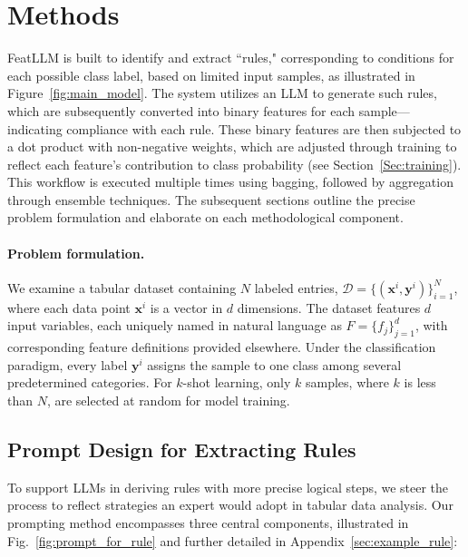 \section{Methods}
\textsf{FeatLLM} is built to identify and extract ``rules," corresponding to conditions for each possible class label, based on limited input samples, as illustrated in Figure~\ref{fig:main_model}. The system utilizes an LLM to generate such rules, which are subsequently converted into binary features for each sample—indicating compliance with each rule. These binary features are then subjected to a dot product with non-negative weights, which are adjusted through training to reflect each feature's contribution to class probability (see Section~\ref{Sec:training}). This workflow is executed multiple times using bagging, followed by aggregation through ensemble techniques. The subsequent sections outline the precise problem formulation and elaborate on each methodological component.

\vspace*{-0.12in}
\paragraph{Problem formulation.} We examine a tabular dataset containing $N$ labeled entries, $\mathcal{D} = \{(\mathbf{x}^i, \mathbf{y}^i)\}_{i=1}^{N}$, where each data point $\mathbf{x}^i$ is a vector in $d$ dimensions. The dataset features $d$ input variables, each uniquely named in natural language as $F = \{f_j\}_{j=1}^{d}$, with corresponding feature definitions provided elsewhere. Under the classification paradigm, every label $\mathbf{y}^i$ assigns the sample to one class among several predetermined categories. For $k$-shot learning, only $k$ samples, where $k$ is less than $N$, are selected at random for model training. 

\subsection{Prompt Design for Extracting Rules}
\label{Sec:prompt_design}
To support LLMs in deriving rules with more precise logical steps, we steer the process to reflect strategies an expert would adopt in tabular data analysis. Our prompting method encompasses three central components, illustrated in Fig.~\ref{fig:prompt_for_rule} and further detailed in Appendix~\ref{sec:example_rule}:

\vspace*{-0.12in}
